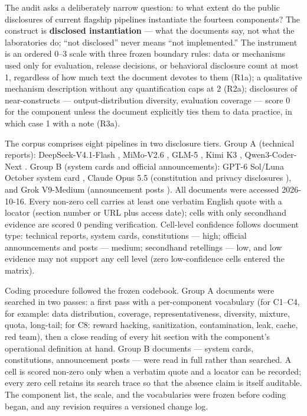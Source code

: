 \documentclass[10pt]{article}
\begin{document}
The audit asks a deliberately narrow question: to what extent do the public disclosures of current flagship pipelines instantiate the fourteen components? The construct is \textbf{disclosed instantiation} --- what the documents say, not what the laboratories do; ``not disclosed'' never means ``not implemented.'' The instrument is an ordered 0--3 scale with three frozen boundary rules: data or mechanisms used only for evaluation, release decisions, or behavioral disclosure count at most 1, regardless of how much text the document devotes to them (R1a); a qualitative mechanism description without any quantification caps at 2 (R2a); disclosures of near-constructs --- output-distribution diversity, evaluation coverage --- score 0 for the component unless the document explicitly ties them to data practice, in which case 1 with a note (R3a).

The corpus comprises eight pipelines in two disclosure tiers. Group A (technical reports): DeepSeek-V4.1-Flash \cite{ref20}, MiMo-V2.6 \cite{ref26}, GLM-5 \cite{ref27}, Kimi K3 \cite{ref31}, Qwen3-Coder-Next \cite{ref28}. Group B (system cards and official announcements): GPT-6 Sol/Luna October system card \cite{ref22}, Claude Opus 5.5 (constitution and privacy disclosures \cite{ref54,ref62}), and Grok V9-Medium (announcement posts \cite{ref21}). All documents were accessed 2026-10-16. Every non-zero cell carries at least one verbatim English quote with a locator (section number or URL plus access date); cells with only secondhand evidence are scored 0 pending verification. Cell-level confidence follows document type: technical reports, system cards, constitutions --- high; official announcements and posts --- medium; secondhand retellings --- low, and low evidence may not support any cell level (zero low-confidence cells entered the matrix).

Coding procedure followed the frozen codebook. Group A documents were searched in two passes: a first pass with a per-component vocabulary (for C1--C4, for example: data distribution, coverage, representativeness, diversity, mixture, quota, long-tail; for C8: reward hacking, sanitization, contamination, leak, cache, red team), then a close reading of every hit section with the component's operational definition at hand. Group B documents --- system cards, constitutions, announcement posts --- were read in full rather than searched. A cell is scored non-zero only when a verbatim quote and a locator can be recorded; every zero cell retains its search trace so that the absence claim is itself auditable. The component list, the scale, and the vocabularies were frozen before coding began, and any revision requires a versioned change log.
\end{document}
